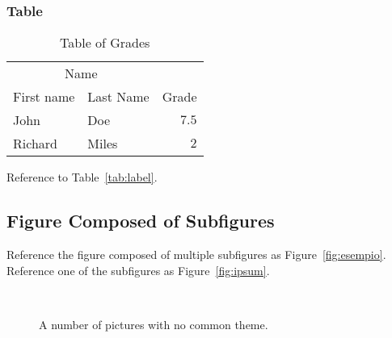 \documentclass[
10pt, %
a4paper, %
oneside, %
headinclude,footinclude, %
BCOR5mm, %
]{scrartcl}
\begin{document}
\subsubsection{Table}

\lipsum[13] %

\begin{table}[hbt]
\caption{Table of Grades}
\centering
\begin{tabular}{llr}
\toprule
\multicolumn{2}{c}{Name} \\
\cmidrule(r){1-2}
First name & Last Name & Grade \\
\midrule
John & Doe & $7.5$ \\
Richard & Miles & $2$ \\
\bottomrule
\end{tabular}
\label{tab:label}
\end{table}

Reference to Table~\vref{tab:label}. %


\subsection{Figure Composed of Subfigures}

Reference the figure composed of multiple subfigures as Figure~\vref{fig:esempio}. Reference one of the subfigures as Figure~\vref{fig:ipsum}. %

\lipsum[15-18] %

\begin{figure}[tb]
\centering
{} \quad
{} \\
 \quad
{}
\caption[A number of pictures.]{A number of pictures with no common theme.} %
\label{fig:esempio}
\end{figure}


\renewcommand{\refname}{\spacedlowsmallcaps{References}} %




\end{document}
